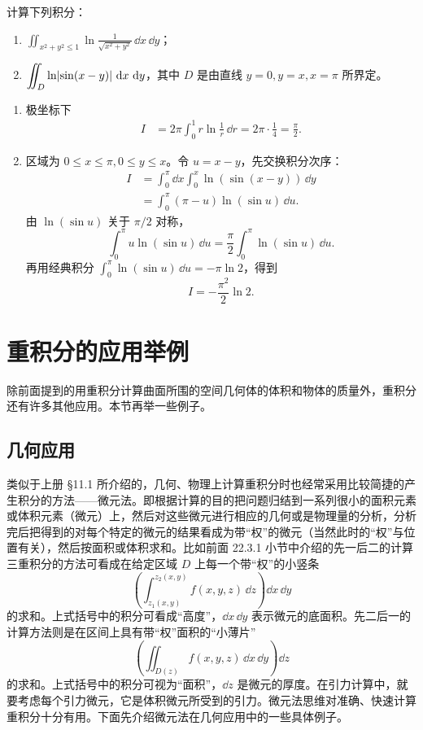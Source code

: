 \begin{xexercise}[6]
计算下列积分：
  \begin{enumerate}[label=(\arabic*)]
    \item $\displaystyle\iint_{x^2+y^2\le1}\ln\frac1{\sqrt{x^2+y^2}}\,\dd x\,\dd y$；
    \item $\displaystyle\iint_D\ln\lvert\sin(x-y)\rvert\,\mathop{}\!\mathrm{d} x\,\mathop{}\!\mathrm{d} y$，其中 $D$ 是由直线 $y=0,y=x,x=\pi$ 所界定。
  \end{enumerate}
\end{xexercise}
\begin{xsolution}
\begin{enumerate}[label=(\arabic*)]
  \item 极坐标下
  \begin{align*}
   I&=2\pi\int_0^1r\ln\frac1r\,\dd r
   =2\pi\cdot\frac14
   =\boxed{\frac\pi2}.
  \end{align*}

  \item 区域为 $0\le x\le\pi,0\le y\le x$。令 $u=x-y$，先交换积分次序：
  \begin{align*}
   I&=\int_0^\pi\dd x\int_0^x\ln(\sin(x-y))\,\dd y\\
   &=\int_0^\pi(\pi-u)\ln(\sin u)\,\dd u.
  \end{align*}
  由 $\ln(\sin u)$ 关于 $\pi/2$ 对称，
  \[
   \int_0^\pi u\ln(\sin u)\,\dd u
   =\frac\pi2\int_0^\pi\ln(\sin u)\,\dd u.
  \]
  再用经典积分 $\int_0^\pi\ln(\sin u)\,\dd u=-\pi\ln2$，得到
  \[
    \boxed{I=-\frac{\pi^2}{2}\ln2}.
  \]
\end{enumerate}
\end{xsolution}


\section{重积分的应用举例}

除前面提到的用重积分计算曲面所围的空间几何体的体积和物体的质量外，重积分还有许多其他应用。本节再举一些例子。

\subsection{几何应用}

类似于上册 §11.1 所介绍的，几何、物理上计算重积分时也经常采用比较简捷的产生积分的方法——微元法。即根据计算的目的把问题归结到一系列很小的面积元素或体积元素（微元）上，然后对这些微元进行相应的几何或是物理量的分析，分析完后把得到的对每个特定的微元的结果看成为带“权”的微元（当然此时的“权”与位置有关），然后按面积或体积求和。比如前面 22.3.1 小节中介绍的先一后二的计算三重积分的方法可看成在给定区域 $D$ 上每一个带“权”的小竖条
\[
  \left(\int_{z_1(x,y)}^{z_2(x,y)}f(x,y,z)\,\dd z\right)\dd x\,\dd y
\]
的求和。上式括号中的积分可看成“高度”，$\dd x\,\dd y$ 表示微元的底面积。先二后一的计算方法则是在区间上具有带“权”面积的“小薄片”
\[
  \left(\iint_{D(z)}f(x,y,z)\,\dd x\,\dd y\right)\dd z
\]
的求和。上式括号中的积分可视为“面积”，$\dd z$ 是微元的厚度。在引力计算中，就要考虑每个引力微元，它是体积微元所受到的引力。微元法思维对准确、快速计算重积分十分有用。下面先介绍微元法在几何应用中的一些具体例子。

